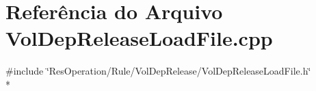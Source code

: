 \section{Referência do Arquivo Vol\+Dep\+Release\+Load\+File.\+cpp}
\label{_2_rule_2_vol_dep_release_2_vol_dep_release_load_file_8cpp}
{\ttfamily \#include \char`\"{}Res\+Operation/\+Rule/\+Vol\+Dep\+Release/\+Vol\+Dep\+Release\+Load\+File.\+h\char`\"{}}\\*
